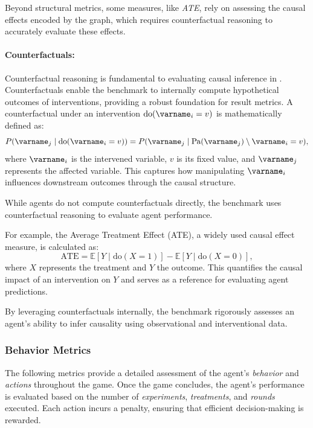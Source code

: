 \documentclass{uai2024} %
\begin{document}
            Beyond structural metrics, some measures, like \emph{ATE}, rely on assessing the causal effects encoded by the graph, which requires counterfactual reasoning to accurately evaluate these effects.

            \paragraph{Counterfactuals:}
                Counterfactual reasoning is fundamental to evaluating causal inference in \game. 
                Counterfactuals enable the benchmark to internally compute hypothetical outcomes of interventions, providing a robust foundation for result metrics. 
                A counterfactual under an intervention $\text{do}(\varname_i = v)$ is mathematically defined as:
                    \begin{equation*}
                        P(\varname_j \mid \text{do}(\varname_i = v)) = P(\varname_j \mid \text{Pa}(\varname_j) \setminus \varname_i = v),
                    \end{equation*}
                where $\varname_i$ is the intervened variable, $v$ is its fixed value, and $\varname_j$ represents the affected variable. 
                This captures how manipulating $\varname_i$ influences downstream outcomes through the causal structure.

                While agents do not compute counterfactuals directly, the benchmark uses counterfactual reasoning to evaluate agent performance. 

                For example, the Average Treatment Effect (ATE), a widely used causal effect measure, is calculated as:
                    \begin{equation*}
                        \text{ATE} = \mathbb{E}[Y \mid \text{do}(X = 1)] - \mathbb{E}[Y \mid \text{do}(X = 0)],
                    \end{equation*}
                where $X$ represents the treatment and $Y$ the outcome. 
                This quantifies the causal impact of an intervention on $ Y $ and serves as a reference for evaluating agent predictions.

                By leveraging counterfactuals internally, the benchmark rigorously assesses an agent's ability to infer causality using observational and interventional data. 



        \subsubsection{Behavior Metrics}
            The following metrics provide a detailed assessment of the agent’s \emph{behavior} and \emph{actions} throughout the game. 
            Once the game concludes, the agent's performance is evaluated based on the number of \emph{experiments}, \emph{treatments}, and \emph{rounds} executed. 
            Each action incurs a penalty, ensuring that efficient decision-making is rewarded.
\end{document}
